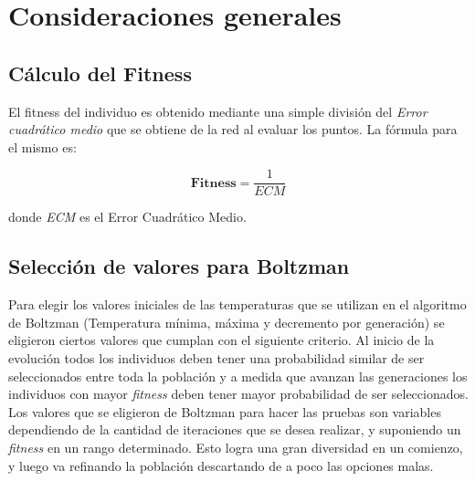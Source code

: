 \documentclass{sig-alternate}
\begin{document}





	\section{Consideraciones generales}

		\subsection{Cálculo del Fitness}

			El fitness del individuo es obtenido mediante una simple división del \textit{Error cuadrático medio} que se obtiene de la red al evaluar los puntos.
			La fórmula para el mismo es:

			\begin{equation}
				\textbf{Fitness} = \dfrac{1}{ECM}
			\end{equation}

			donde \textit{ECM} es el Error Cuadrático Medio.

		\subsection{Selección de valores para Boltzman}

			Para elegir los valores iniciales de las temperaturas que se utilizan en el algoritmo de Boltzman (Temperatura mínima, máxima y decremento por generación) se eligieron ciertos valores que cumplan con el siguiente criterio. Al inicio de la evolución todos los individuos deben tener una probabilidad similar de ser seleccionados entre toda la población y a medida que avanzan las generaciones los individuos con mayor \textit{fitness} deben tener mayor probabilidad de ser seleccionados.
			Los valores que se eligieron de Boltzman para hacer las pruebas son variables dependiendo de la cantidad de iteraciones que se desea realizar, y suponiendo un \textit{fitness} en un rango determinado. Esto logra una gran diversidad en un comienzo, y luego va refinando la población descartando de a poco las opciones malas. 	
\end{document}

